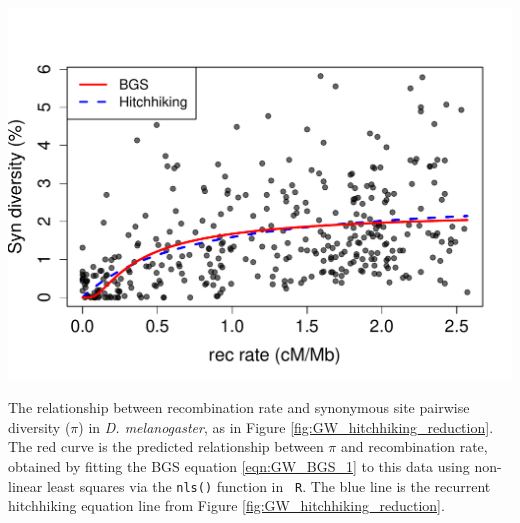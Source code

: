 \begin{marginfigure}[2cm]
\begin{center}
\includegraphics[width=\textwidth]{figures/Genomewide_BGS_HH.pdf}
\end{center}
\caption{The relationship between recombination rate and synonymous
  site pairwise diversity ($\pi$) in {\it D. melanogaster}, as
  in Figure \ref{fig:GW_hitchhiking_reduction}. The red curve is the
  predicted relationship between $\pi$ and recombination rate, obtained
  by fitting the BGS equation \eqref{eqn:GW_BGS_1} to this data  
 using non-linear least squares via the {\tt nls()} function in {\tt
   R}. The blue line is the recurrent hitchhiking equation line from Figure
 \ref{fig:GW_hitchhiking_reduction}. } \label{fig:GW_BGS_reduction}
\end{marginfigure}

